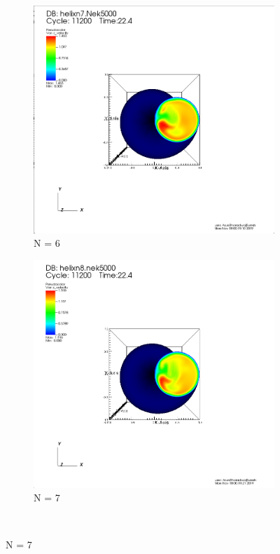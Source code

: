 \documentclass[12pt]{article}
\begin{document}
\begin{figure}[h]
\begin{subfigure}[h]{0.400\textwidth}
		\includegraphics[width=\textwidth]{z7c11200.png}
		\caption{N = 6}
	\end{subfigure}
	\begin{subfigure}[h]{0.400\textwidth}
		\centering
		\includegraphics[width=\textwidth]{z8c11200.png}
		\caption{N = 7}
	\end{subfigure}\\ 
\end{figure}\\\\  
\end{document}
